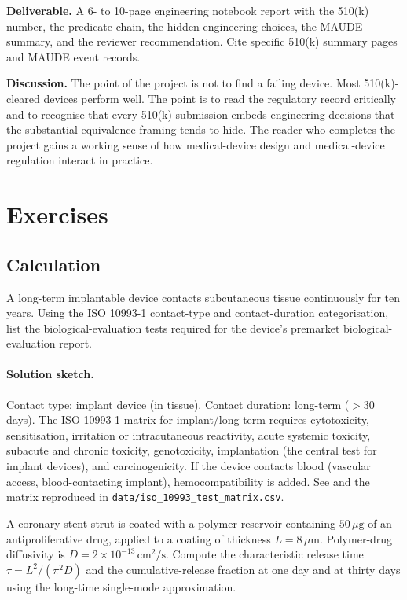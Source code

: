 \begin{project}
\textbf{Deliverable.} A 6- to 10-page engineering notebook report
with the 510(k) number, the predicate chain, the hidden
engineering choices, the MAUDE summary, and the reviewer
recommendation. Cite specific 510(k) summary pages and MAUDE event
records.

\textbf{Discussion.} The point of the project is not to find a
failing device. Most 510(k)-cleared devices perform well. The
point is to read the regulatory record critically and to recognise
that every 510(k) submission embeds engineering decisions that the
substantial-equivalence framing tends to hide. The reader who
completes the project gains a working sense of how medical-device
design and medical-device regulation interact in practice.
\end{project}

\section{Exercises}

\subsection*{Calculation}

\begin{exercise}
A long-term implantable device contacts subcutaneous tissue
continuously for ten years. Using the ISO 10993-1 contact-type
and contact-duration categorisation, list the biological-evaluation
tests required for the device's premarket biological-evaluation
report.
\end{exercise}

\paragraph{Solution sketch.}
Contact type: implant device (in tissue). Contact duration: long-term
($> 30$ days). The ISO 10993-1 matrix for implant/long-term
requires cytotoxicity, sensitisation, irritation or intracutaneous
reactivity, acute systemic toxicity, subacute and chronic toxicity,
genotoxicity, implantation (the central test for implant devices),
and carcinogenicity. If the device contacts blood (vascular access,
blood-contacting implant), hemocompatibility is added. See
\cite{std:v6c12-iso-10993-1-2018} and the matrix reproduced in
\texttt{data/iso\_10993\_test\_matrix.csv}.

\begin{exercise}
A coronary stent strut is coated with a polymer reservoir
containing $50 \,\mu\text{g}$ of an antiproliferative drug, applied
to a coating of thickness $L = 8 \,\mu\text{m}$. Polymer-drug
diffusivity is $D = 2 \times 10^{-13} \,\text{cm}^2/\text{s}$.
Compute the characteristic release time $\tau = L^2 / (\pi^2 D)$
and the cumulative-release fraction at one day and at thirty
days using the long-time single-mode approximation.
\end{exercise}


